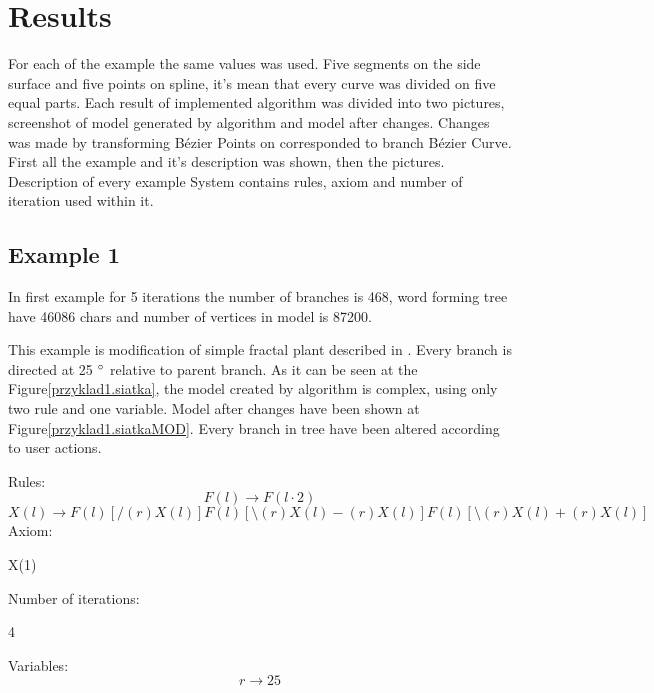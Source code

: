 \documentclass[b5paper,twoside,11pt]{article}
\renewcommand{\figurename}{Figure}
\begin{document}
\section{Results}
For each of the example the same values was used. Five segments on the side surface and five points on spline, it's mean that every curve was divided on five equal parts. Each result of implemented algorithm was divided into two pictures, screenshot of model generated by algorithm and model after changes. Changes was made by transforming Bézier Points on corresponded to branch Bézier Curve. First all the example and it's description was shown, then the pictures. Description of every example System contains rules, axiom and number of iteration used within it.
\subsection*{Example 1}
In first example for 5 iterations the number of branches is 468, word forming tree have 46086 chars and number of vertices in model is 87200.\par
This example is modification of simple fractal plant described in \cite{prusinABOP}.
Every branch is directed at 25  $\degree$ relative to parent branch. As it can be seen at the \figurename \ref{przyklad1.siatka}, the model created by algorithm is complex, using only two rule and one variable. Model after changes have been shown at  \figurename \ref{przyklad1.siatkaMOD}. Every branch in tree have been altered according to user actions.\par 
Rules: \newline
\begin{equation}
F(l)\rightarrow F(l\cdot2) 
\end{equation}
\begin{equation}
X(l) \rightarrow F(l)[/(r)X(l)]F(l)[\setminus(r)X(l)-(r)X(l)]F(l)[\setminus(r)X(l)+(r)X(l)] 
\end{equation}
Axiom:
\begin{center}
X(1)
\end{center}
Number of iterations:
\begin{center}
4
\end{center}
Variables:
\begin{equation}
r\rightarrow 25
\end{equation}
\end{document}
